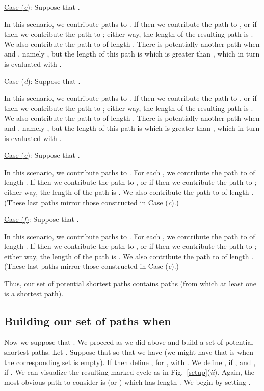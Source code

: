 \documentclass{article}
\begin{document}
\noindent\underline{Case (\emph{c\/})}: Suppose that .\smallskip

\noindent In this scenario, we contribute  paths to . If  then we contribute the path  to , or if  then we contribute the path  to ; either way, the length of the resulting path is . We also contribute the path  to  of length . There is potentially another path when  and , namely , but the length of this path is  which is greater than , which in turn is  evaluated with .\smallskip

\noindent\underline{Case (\emph{d\/})}: Suppose that .\smallskip

\noindent In this scenario, we contribute  paths to . If  then we contribute the path  to , or if  then we contribute the path  to ; either way, the length of the resulting path is . We also contribute the path  to  of length . There is potentially another path when  and , namely , but the length of this path is  which is greater than , which in turn is  evaluated with .\smallskip

\noindent\underline{Case (\emph{e\/})}: Suppose that .\smallskip

\noindent In this scenario, we contribute  paths to . For each , we contribute the path  to  of length . If  then we contribute the path  to , or if  then we contribute the path  to ; either way, the length of the path is . We also contribute the path  to  of length . (These last  paths mirror those constructed in Case (\emph{c\/}).)\smallskip

\noindent\underline{Case (\emph{f\/})}: Suppose that .\smallskip

\noindent In this scenario, we contribute  paths to . For each , we contribute the path  to  of length . If  then we contribute the path  to , or if  then we contribute the path  to ; either way, the length of the path is . We also contribute the path  to  of length . (These last  paths mirror those constructed in Case (\emph{c\/}).)\smallskip

Thus, our set  of potential shortest paths contains  paths (from which at least one is a shortest path).

\subsection{Building our set of paths when }\label{samesourcedest}

Now we suppose that . We proceed as we did above and build a set  of potential shortest paths. Let . Suppose that  so that we have  (we might have that  is  when the corresponding set is empty). If  then define , for , with . We define , if , and , if . We can visualize the resulting marked cycle  as in Fig.~\ref{setup}(\emph{ii\/}). Again, the most obvious path to consider is  (or ) which has length . We begin by setting . \smallskip
\end{document}
